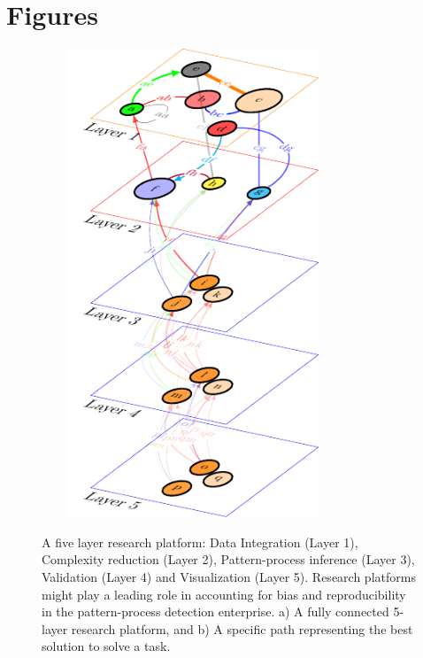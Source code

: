 \documentclass[english,12pt]{article}
\begin{document}
\newpage

\section{Figures}

\vspace{-7 in}
\begin{figure}
  \vspace{-7 in}
\begin{center}
  \hspace{-0.5 in}\includegraphics[width=9cm,height=14cm]{multilayer.pdf}\\
\end{center}
\caption{A five layer research platform: Data Integration (Layer 1),
  Complexity reduction (Layer 2), Pattern-process inference (Layer 3),
  Validation (Layer 4) and Visualization (Layer 5). Research platforms
  might play a leading role in accounting for bias and reproducibility
  in the pattern-process detection enterprise. a) A fully connected
  5-layer research platform, and b) A specific path representing the
  best solution to solve a task.}
\label{}
\end{figure}
  
\end{document}
